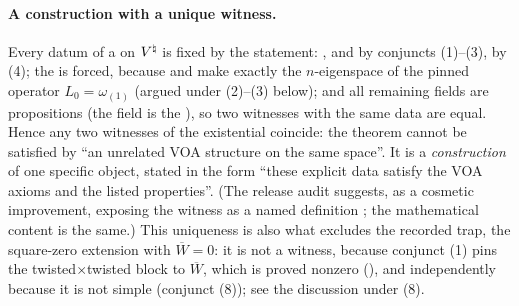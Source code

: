 \paragraph{A construction with a unique witness.}  Every datum of a  on
${V^{\natural}}$ is fixed by the statement: ,  and  by conjuncts
(1)--(3),  by (4); the  is forced, because  and
 make  exactly the $n$-eigenspace of the pinned operator
$L_0=\omega_{(1)}$ (argued under (2)--(3) below); and all remaining fields are propositions (the field
 is the  ), so two witnesses with the same data are
equal.  Hence any two witnesses of the existential coincide: the theorem cannot be satisfied by ``an
unrelated VOA structure on the same space''.  It is a \emph{construction} of one specific object,
stated in the form ``these explicit data satisfy the VOA axioms and the listed properties''.  (The
release audit suggests, as a cosmetic improvement, exposing the witness as a named definition
; the mathematical content is the same.)  This uniqueness is also what
excludes the recorded trap, the square-zero extension with $\overline W=0$: it is not a witness,
because conjunct (1) pins the twisted$\times$twisted block to $\overline W$, which is proved nonzero
(), and independently because it is not simple (conjunct (8)); see the
discussion under (8).

